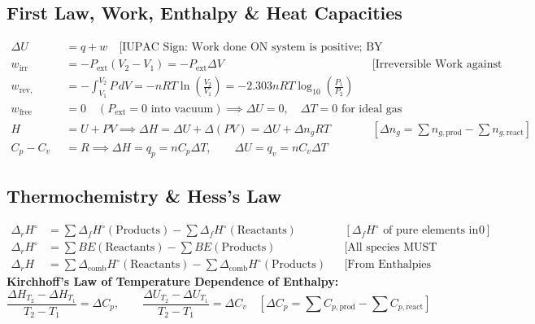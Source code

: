 \documentclass[11pt,a4paper]{article}
\begin{document}
\subsection{First Law, Work, Enthalpy \& Heat Capacities}

\begin{formulabox}
\begin{align}
  \Delta U &= q + w \quad \text{[IUPAC Sign: Work done ON system is positive; BY system is negative]} \\
  w_{\text{irr}} &= -P_{\text{ext}}(V_2 - V_1) = -P_{\text{ext}}\Delta V && \text{[Irreversible Work against Constant External Pressure]} \\
  w_{\text{rev, isothermal}} &= -\int_{V_1}^{V_2} P\,dV = -n R T \ln\left(\frac{V_2}{V_1}\right) = -2.303 n R T \log_{10}\left(\frac{P_1}{P_2}\right) \\
  w_{\text{free expansion}} &= 0 \quad (P_{\text{ext}} = 0 \text{ into vacuum}) \implies \Delta U = 0, \quad \Delta T = 0 \text{ for ideal gas} \\
  H &= U + P V \implies \Delta H = \Delta U + \Delta(P V) = \Delta U + \Delta n_g R T && [\Delta n_g = \sum n_{g,\text{prod}} - \sum n_{g,\text{react}}] \\
  C_p - C_v &= R \implies \Delta H = q_p = n C_p \Delta T, \qquad \Delta U = q_v = n C_v \Delta T
\end{align}
\end{formulabox}

\subsection{Thermochemistry \& Hess's Law}

\begin{formulabox}
\begin{align}
  \Delta_r H^\circ &= \sum \Delta_f H^\circ(\text{Products}) - \sum \Delta_f H^\circ(\text{Reactants}) && [\Delta_f H^\circ \text{ of pure elements in standard state is } 0] \\
  \Delta_r H^\circ &= \sum BE(\text{Reactants}) - \sum BE(\text{Products}) && \text{[All species MUST be in GASEOUS state!]} \\
  \Delta_r H &= \sum \Delta_{\text{comb}} H^\circ(\text{Reactants}) - \sum \Delta_{\text{comb}} H^\circ(\text{Products}) && \text{[From Enthalpies of Combustion]}
\end{align}
\textbf{Kirchhoff's Law of Temperature Dependence of Enthalpy:}
\begin{equation}
  \frac{\Delta H_{T_2} - \Delta H_{T_1}}{T_2 - T_1} = \Delta C_p, \qquad \frac{\Delta U_{T_2} - \Delta U_{T_1}}{T_2 - T_1} = \Delta C_v \quad \left[\Delta C_p = \sum C_{p,\text{prod}} - \sum C_{p,\text{react}}\right]
\end{equation}
\end{formulabox}
\end{document}
